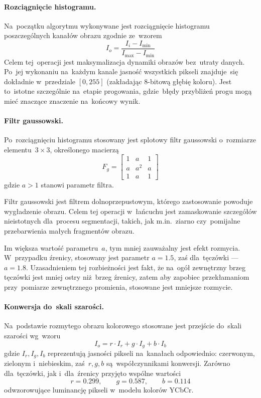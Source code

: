 \documentclass[11pt,a4paper]{article}
\begin{document}
\paragraph{Rozciągnięcie histogramu.}
Na~początku algorytmu wykonywane jest rozciągnięcie histogramu poszczególnych kanałów obrazu zgodnie ze~wzorem
$$ I_o = \frac{I_i - I_{\min}}{I_{\max} - I_{\min}} $$
Celem tej~operacji jest maksymalizacja dynamiki obrazów bez~utraty danych.
Po~jej wykonaniu na~każdym kanale jasność wszystkich pikseli znajduje~się dokładnie w~przedziale $[0, 255]$ (zakładając 8-bitową głębię koloru).
Jest to~istotne szczególnie na~etapie progowania, gdzie~błędy przybliżeń progu mogą mieć znaczące znaczenie na~końcowy wynik.

\paragraph{Filtr gaussowski.}
Po~rozciągnięciu histogramu stosowany jest splotowy filtr gaussowski o~rozmiarze elementu~$3 \times 3$, określonego macierzą
$$ F_g = \begin{bmatrix}
    1 & a & 1 \\
    a & a^2 & a \\
    1 & a & 1
\end{bmatrix} $$
gdzie $a > 1$ stanowi parametr filtra.

Filtr gaussowski jest filtrem dolnoprzepustowym, którego zastosowanie powoduje wygładzenie obrazu.
Celem tej operacji w~łańcuchu jest zamaskowanie szczegółów nieistotnych dla~procesu segmentacji, takich, jak m.in.~ziarno czy~pomijalne przebarwienia małych fragmentów obrazu.

Im większa wartość parametru~$a$, tym mniej zauważalny jest efekt rozmycia.
W~przypadku źrenicy, stosowany jest parametr $a = 1.5$, zaś dla~tęczówki --- $a = 1.8$.
Uzasadnieniem tej rozbieżności jest fakt, że na~ogół zewnętrzny brzeg tęczówki jest mniej ostry niż~brzeg źrenicy, zatem aby zapobiec przekłamaniom przy~pomiarze zewnętrznego promienia, stosowane jest mniejsze rozmycie.

\paragraph{Konwersja do~skali szarości.}
Na~podstawie rozmytego obrazu kolorowego stosowane jest przejście do~skali szarości wg~wzoru
$$ I_o = r \cdot I_r + g \cdot I_g + b \cdot I_b $$
gdzie $I_r, I_g, I_b$ reprezentują jasności pikseli na~kanałach odpowiednio: czerwonym, zielonym i~niebieskim, zaś~$r, g, b$ są~współczynnikami konwersji.
Zarówno dla~tęczówki, jak i~dla~źrenicy przyjęto wspólne wartości
$$ r = 0.299, \qquad g = 0.587, \qquad b = 0.114 $$
odwzorowujące luminancję pikseli w~modelu kolorów YCbCr.
\end{document}
